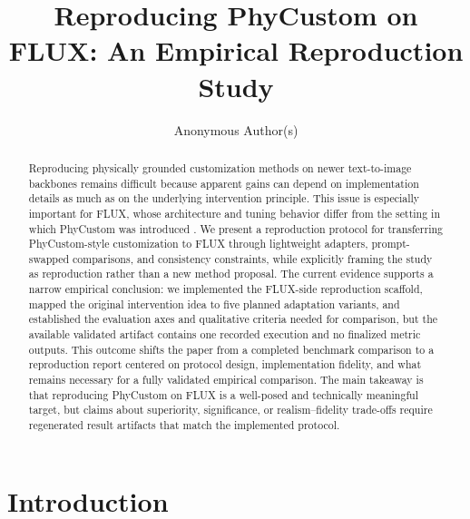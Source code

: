\documentclass{article}
\title{Reproducing PhyCustom on FLUX: An Empirical Reproduction Study}
\author{Anonymous Author(s)}
\begin{document}
\maketitle

\begin{abstract}
Reproducing physically grounded customization methods on newer text-to-image backbones remains difficult because apparent gains can depend on implementation details as much as on the underlying intervention principle. This issue is especially important for FLUX, whose architecture and tuning behavior differ from the setting in which PhyCustom was introduced \cite{wu2025phycustom,blackforestlabs2024fluxdev}. We present a reproduction protocol for transferring PhyCustom-style customization to FLUX through lightweight adapters, prompt-swapped comparisons, and consistency constraints, while explicitly framing the study as reproduction rather than a new method proposal. The current evidence supports a narrow empirical conclusion: we implemented the FLUX-side reproduction scaffold, mapped the original intervention idea to five planned adaptation variants, and established the evaluation axes and qualitative criteria needed for comparison, but the available validated artifact contains one recorded execution and no finalized metric outputs. This outcome shifts the paper from a completed benchmark comparison to a reproduction report centered on protocol design, implementation fidelity, and what remains necessary for a fully validated empirical comparison. The main takeaway is that reproducing PhyCustom on FLUX is a well-posed and technically meaningful target, but claims about superiority, significance, or realism--fidelity trade-offs require regenerated result artifacts that match the implemented protocol.
\end{abstract}

\section{Introduction}
\end{document}
